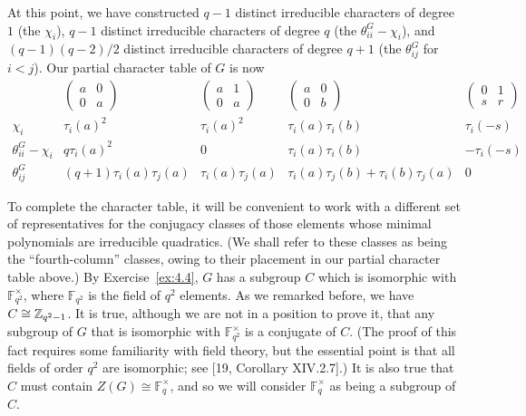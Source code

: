 \documentclass[../Odyssey_Project.tex]{subfiles}
\begin{document}
\noindent At this point, we have constructed $q - 1$ distinct irreducible characters of degree $1$ (the $\chi_i$), $q - 1$ distinct irreducible characters of degree $q$ (the $\theta_{ii}^G - \chi_i$), and $(q - 1)(q - 2)/2$ distinct irreducible characters of degree $q + 1$ (the $\theta_{ij}^G$ for $i < j$). Our partial character table of $G$ is now
\[
\begin{array}{c|cccc}
 & \begin{pmatrix} a & 0 \\ 0 & a \end{pmatrix} & \begin{pmatrix} a & 1 \\ 0 & a \end{pmatrix} & \begin{pmatrix} a & 0 \\ 0 & b \end{pmatrix} & \begin{pmatrix} 0 & 1 \\ s & r \end{pmatrix} \\
\hline
\chi_i & \tau_i(a)^2 & \tau_i(a)^2 & \tau_i(a) \tau_i(b) & \tau_i(-s) \\
\theta_{ii}^G - \chi_i & q \tau_i(a)^2 & 0 & \tau_i(a) \tau_i(b) & -\tau_i(-s) \\
\theta_{ij}^G & (q + 1) \tau_i(a) \tau_j(a) & \tau_i(a) \tau_j(a) & \tau_i(a) \tau_j(b) + \tau_i(b) \tau_j(a) & 0
\end{array}
\]

\noindent To complete the character table, it will be convenient to work with a different set of representatives for the conjugacy classes of those elements whose minimal polynomials are irreducible quadratics. (We shall refer to these classes as being the ``fourth-column'' classes, owing to their placement in our partial character table above.) By Exercise~\ref{ex:4.4}, $G$ has a subgroup $C$ which is isomorphic with $\mathbb{F}_{q^2}^\times$, where $\mathbb{F}_{q^2}$ is the field of $q^2$ elements. As we remarked before, we have $C \cong \mathbb{Z}_{q^2 - 1}$. It is true, although we are not in a position to prove it, that any subgroup of $G$ that is isomorphic with $\mathbb{F}_{q^2}^\times$ is a conjugate of $C$. (The proof of this fact requires some familiarity with field theory, but the essential point is that all fields of order $q^2$ are isomorphic; see [19, Corollary XIV.2.7].) It is also true that $C$ must contain $Z(G) \cong \mathbb{F}_q^\times$, and so we will consider $\mathbb{F}_q^\times$ as being a subgroup of $C$.
\end{document}
